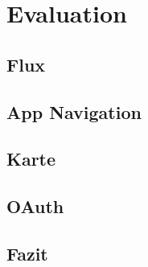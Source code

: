 \chapter{Evaluation}
\label{tb-evaluation}

\section{Flux}

\section{App Navigation}

\section{Karte}

\section{OAuth}

\section{Fazit}
